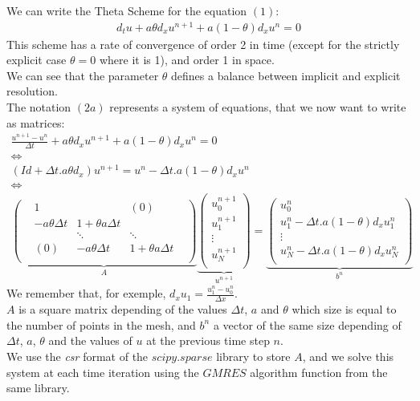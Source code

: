 \documentclass[12pt]{article}
\begin{document}
\vspace{8pt}
We can write the Theta Scheme for the equation $(1)$:
\begin{align*}
    d_t u + a\theta d_x u^{n+1} + a(1-\theta) d_x u^n = 0 \tag{2a}
\end{align*}
This scheme has a rate of convergence of order 2 in time (except for the strictly explicit case $\theta=0$ where it is 1), and order 1 in space.\\
We can see that the parameter $\theta$ defines a balance between implicit and explicit resolution.\\
The notation $(2a)$ represents a system of equations, that we now want to write as matrices: \\

\[
\begin{array}{c}
\displaystyle \frac{u^{n+1} - u^n}{\Delta t} + a\theta d_x u^{n+1} + a(1-\theta) d_x u^n = 0 \\
\Leftrightarrow \\
\displaystyle (Id + \Delta t . a \theta d_x)u^{n+1} = u^n - \Delta t .a(1-\theta)d_x u^n \\
\Leftrightarrow \\

\underbrace{
    \begin{pmatrix}
    & 1 & & (0) &\\
    & -a\theta\Delta t & 1+\theta a \Delta t & & \\
    & & \ddots & \ddots \\
    & (0) & -a\theta\Delta t & 1+\theta a \Delta t \\
    \end{pmatrix}
}_{\text{$A$}}

\underbrace{
    \begin{pmatrix}
    u_0^{n+1}\\
    u_1^{n+1}\\
    \vdots \\
    u_N^{n+1}\\
    \end{pmatrix}
}_{\text{$u^{n+1}$}}
=
\underbrace{
    \begin{pmatrix}
    u_0^n\\
    u_1^n - \Delta t .a(1-\theta)d_x u_1^n\\
    \vdots \\
    u_{N}^n - \Delta t .a(1-\theta)d_x u_{N}^n\\
    \end{pmatrix}
}_{b^n} \tag{2b}
\end{array}
\]
We remember that, for exemple, $d_x u_1 = \frac{u_1^n - u_0^n}{\Delta x}$.\\
$A$ is a square matrix depending of the values $\Delta t$, $a$ and $\theta$ which size is equal to the number of points in the mesh,
and $b^n$ a vector of the same size depending of $\Delta t$, $a$, $\theta$ and the values of $u$ at the previous time step $n$.\\
We use the \textit{csr} format of the $scipy.sparse$ library to store $A$, and we solve this system at each time iteration using the $GMRES$ algorithm function from the same library. 
\end{document}
